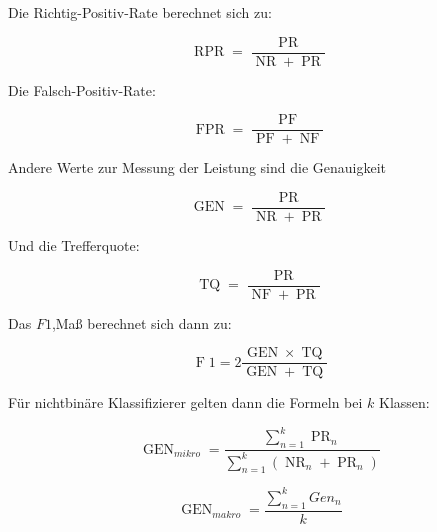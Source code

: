 \documentclass[11pt]{article} %
\DeclareMathOperator{\PR}{PR}
\DeclareMathOperator{\PF}{PF}
\DeclareMathOperator{\NF}{NF}
\DeclareMathOperator{\NR}{NR}
\DeclareMathOperator{\FPR}{FPR}
\DeclareMathOperator{\RPR}{RPR}
\DeclareMathOperator{\GEN}{GEN}
\DeclareMathOperator{\TQ}{TQ}
\DeclareMathOperator{\F}{F}
\begin{document}
Die Richtig-Positiv-Rate berechnet sich zu:

\begin{equation}
\RPR = \frac{\PR}{\NR+\PR}
\end{equation}

Die Falsch-Positiv-Rate:

\begin{equation}
\FPR = \frac{\PF}{\PF+\NF}
\end{equation}

Andere Werte zur Messung der Leistung sind die Genauigkeit

\begin{equation}
\GEN = \frac{\PR}{\NR+\PR}
\end{equation}

Und die Trefferquote:

\begin{equation}
\TQ = \frac{\PR}{\NF+\PR}
\end{equation}

Das $F1$,Maß berechnet sich dann zu:

\begin{equation}
\F 1= 2 \frac{\GEN \times \TQ}{\GEN+\TQ}
\end{equation}

Für nichtbinäre Klassifizierer gelten dann die Formeln bei $k$ Klassen:

\begin{equation}
\GEN_{mikro} = \frac{\sum_{n=1}^k \PR_n}{\sum_{n=1}^k (\NR_n+\PR_n)}
\end{equation}

\begin{equation}
\GEN_{makro} = \frac{\sum_{n=1}^k Gen_n}{k}
\end{equation}
\end{document}
